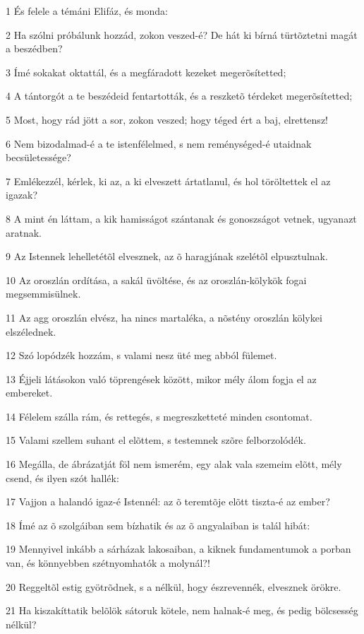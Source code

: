 \par 1 És felele a témáni Elifáz, és monda:
\par 2 Ha szólni próbálunk hozzád, zokon veszed-é? De hát ki bírná türtõztetni magát a beszédben?
\par 3 Ímé sokakat oktattál, és a megfáradott kezeket megerõsítetted;
\par 4 A tántorgót a te beszédeid fentartották, és a reszketõ térdeket megerõsítetted;
\par 5 Most, hogy rád jött a sor, zokon veszed; hogy téged ért a baj, elrettensz!
\par 6 Nem bizodalmad-é a te istenfélelmed, s nem reménységed-é utaidnak becsületessége?
\par 7 Emlékezzél, kérlek, ki az, a ki elveszett ártatlanul, és hol töröltettek el az igazak?
\par 8 A mint én láttam, a kik hamisságot szántanak és gonoszságot vetnek, ugyanazt aratnak.
\par 9 Az Istennek lehelletétõl elvesznek, az õ haragjának szelétõl elpusztulnak.
\par 10 Az oroszlán ordítása, a sakál üvöltése, és az oroszlán-kölykök fogai megsemmisülnek.
\par 11 Az agg oroszlán elvész, ha nincs martaléka, a nõstény oroszlán kölykei elszélednek.
\par 12 Szó lopódzék hozzám, s valami nesz üté meg abból fülemet.
\par 13 Éjjeli látásokon való töprengések között, mikor mély álom fogja el az embereket.
\par 14 Félelem szálla rám, és rettegés, s megreszketteté minden csontomat.
\par 15 Valami szellem suhant el elõttem, s testemnek szõre felborzolódék.
\par 16 Megálla, de ábrázatját föl nem ismerém, egy alak vala szemeim elõtt, mély csend, és ilyen szót hallék:
\par 17 Vajjon a halandó igaz-é Istennél: az õ teremtõje elõtt tiszta-é az ember?
\par 18 Ímé az õ szolgáiban sem bízhatik és az õ angyalaiban is talál hibát:
\par 19 Mennyivel inkább a sárházak lakosaiban, a kiknek fundamentumok a porban van, és könnyebben szétnyomhatók a molynál?!
\par 20 Reggeltõl estig gyötrõdnek, s a nélkül, hogy észrevennék, elvesznek örökre.
\par 21 Ha kiszakíttatik belõlök sátoruk kötele, nem halnak-é meg, és pedig bölcsesség nélkül?

